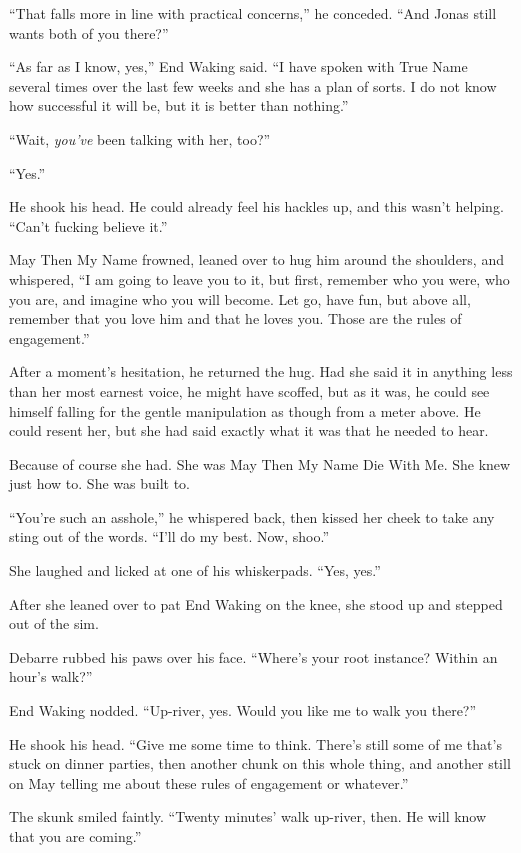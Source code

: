 ``That falls more in line with practical concerns,'' he conceded. ``And Jonas still wants both of you there?''

``As far as I know, yes,'' End Waking said. ``I have spoken with True Name several times over the last few weeks and she has a plan of sorts. I do not know how successful it will be, but it is better than nothing.''

``Wait, \emph{you've} been talking with her, too?''

``Yes.''

He shook his head. He could already feel his hackles up, and this wasn't helping. ``Can't fucking believe it.''

May Then My Name frowned, leaned over to hug him around the shoulders, and whispered, ``I am going to leave you to it, but first, remember who you were, who you are, and imagine who you will become. Let go, have fun, but above all, remember that you love him and that he loves you. Those are the rules of engagement.''

After a moment's hesitation, he returned the hug. Had she said it in anything less than her most earnest voice, he might have scoffed, but as it was, he could see himself falling for the gentle manipulation as though from a meter above. He could resent her, but she had said exactly what it was that he needed to hear.

Because of course she had. She was May Then My Name Die With Me. She knew just how to. She was built to.

``You're such an asshole,'' he whispered back, then kissed her cheek to take any sting out of the words. ``I'll do my best. Now, shoo.''

She laughed and licked at one of his whiskerpads. ``Yes, yes.''

After she leaned over to pat End Waking on the knee, she stood up and stepped out of the sim.

Debarre rubbed his paws over his face. ``Where's your root instance? Within an hour's walk?''

End Waking nodded. ``Up-river, yes. Would you like me to walk you there?''

He shook his head. ``Give me some time to think. There's still some of me that's stuck on dinner parties, then another chunk on this whole thing, and another still on May telling me about these rules of engagement or whatever.''

The skunk smiled faintly. ``Twenty minutes' walk up-river, then. He will know that you are coming.''

